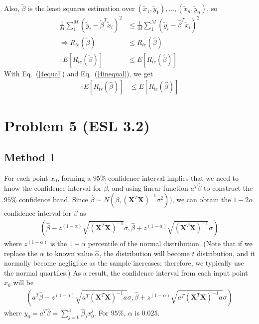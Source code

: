 \documentclass[pra,groupedaddress,amsmath,amssymb, column]{revtex4}
\begin{document}
Also, $\tilde{\beta}$ is the least squares estimation over $(\tilde{x}_1,\tilde{y}_1),...,(\tilde{x}_n,\tilde{y}_n)$, so
\begin{align}
 \frac{1}{M}\sum_{1}^M(\tilde{y}_i - \tilde{\beta}^T\tilde{x}_i)^2 &\leq  \frac{1}{M}\sum_{1}^M(\tilde{y}_i - \hat{\beta}^T\tilde{x}_i)^2\nonumber\\
  \Rightarrow R_{te}({\tilde{\beta}})&\leq R_{te}({\hat{\beta}})\nonumber\\
 \therefore E[R_{te}({\tilde{\beta}})]&\leq E[R_{te}({\hat{\beta}})]\label{4inequal}
 \end{align}
With Eq.~(\ref{4equal}) and Eq.~(\ref{4inequal}), we get
\begin{align}
  \therefore E[R_{tr}({\hat{\beta}})]&\leq E[R_{te}({\hat{\beta}})]\label{4inequal}
 \end{align}

\section*{Problem 5 (ESL 3.2)}
\subsection*{Method 1}
For each point $x_0$, forming a $95\%$ confidence interval implies that we need to know the confidence interval for $\hat{\beta}$, and using linear function $a^T\hat{\beta}$ to construct the $95\%$ confidence band. Since $\hat{\beta}\sim N(\beta, (\mathbf{X}^T\mathbf{X})^{-1}\sigma^2))$, we can obtain the $1-2\alpha$ confidence interval for $\beta$ as
\begin{align}
\left( \hat{\beta} - z^{(1-\alpha)}\sqrt{(\mathbf{X}^T\mathbf{X})^{-1}}{\sigma},  \hat{\beta} + z^{(1-\alpha)}\sqrt{(\mathbf{X}^T\mathbf{X})^{-1}}{\sigma}\right)
\end{align}
where $z^{(1-\alpha)}$ is the $1-\alpha$ percentile of the normal distribution. (Note that if we replace the $\alpha$ to known value $\hat{\alpha}$, the distribution will become $t$ distribution, and it normally become negligible as the sample increases; therefore, we typically use the normal quartiles.)
As a result, the confidence interval from each input point $x_0$ will be
\begin{align}
\left( a^T\hat{\beta} - z^{(1-\alpha)}\sqrt{a^T(\mathbf{X}^T\mathbf{X})^{-1}a}{\sigma},  \hat{\beta} + z^{(1-\alpha)}\sqrt{a^T(\mathbf{X}^T\mathbf{X})^{-1}a}{\sigma}\right)
\end{align}
where $y_0 = a^T\hat{\beta} = \sum_{j=0}^3\hat{\beta}_jx_0^j$. For $95\%$, $\alpha$ is $0.025$.
\end{document}
